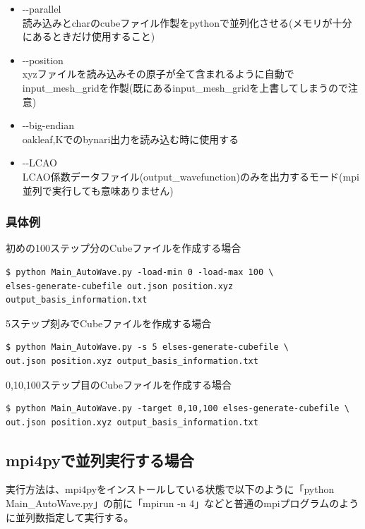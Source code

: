 \documentclass{jsarticle}
\begin{document}
\begin{itemize}
\item -\--parallel\\
読み込みとcharのcubeファイル作製をpythonで並列化させる(メモリが十分にあるときだけ使用すること)\\
\item -\--position\\
xyzファイルを読み込みその原子が全て含まれるように自動でinput\_mesh\_gridを作製(既にあるinput\_mesh\_gridを上書してしまうので注意)\\
\item -\--big-endian\\
oakleaf,Kでのbynari出力を読み込む時に使用する\\
\item -\--LCAO\\
LCAO係数データファイル(output\_wavefunction)のみを出力するモード(mpi並列で実行しても意味ありません)\\
\end{itemize}

\subsubsection{具体例}
初めの100ステップ分のCubeファイルを作成する場合
\begin{Verbatim}[frame=single]
$ python Main_AutoWave.py -load-min 0 -load-max 100 \
elses-generate-cubefile out.json position.xyz output_basis_information.txt
\end{Verbatim}
5ステップ刻みでCubeファイルを作成する場合
\begin{Verbatim}[frame=single]
$ python Main_AutoWave.py -s 5 elses-generate-cubefile \
out.json position.xyz output_basis_information.txt
\end{Verbatim}
0,10,100ステップ目のCubeファイルを作成する場合
\begin{Verbatim}[frame=single]
$ python Main_AutoWave.py -target 0,10,100 elses-generate-cubefile \
out.json position.xyz output_basis_information.txt
\end{Verbatim}


\subsection{mpi4pyで並列実行する場合}
実行方法は、mpi4pyをインストールしている状態で以下のように「python Main\_AutoWave.py」の前に「mpirun -n 4」などと普通のmpiプログラムのように並列数指定して実行する。
\end{document}
